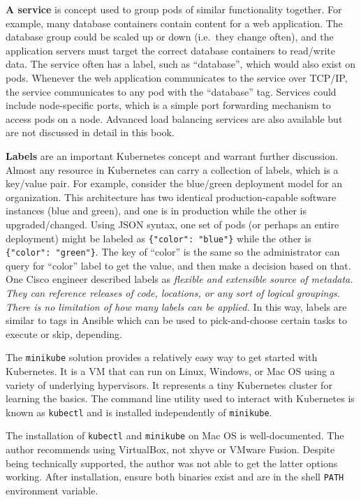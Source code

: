 \textbf{A service} is concept used to group pods of similar functionality
together. For example, many database containers contain content for a web
application. The database group could be scaled up or down (i.e.\ they change
often), and the application servers must target the correct database
containers to read/write data. The service often has a label, such as
``database'', which would also exist on pods. Whenever the web application
communicates to the service over TCP/IP, the service communicates to any pod
with the ``database'' tag. Services could include node-specific ports, which is
a simple port forwarding mechanism to access pods on a node. Advanced load
balancing services are also available but are not discussed in detail in this
book.

\textbf{Labels} are an important Kubernetes concept and warrant further
discussion. Almost any resource in Kubernetes can carry a collection of
labels, which is a key/value pair. For example, consider the blue/green
deployment model for an organization. This architecture has two identical
production-capable software instances (blue and green), and one is in
production while the other is upgraded/changed. Using JSON syntax, one set of
pods (or perhaps an entire deployment) might be labeled as \verb|{"color": "blue"}|
while the other is \verb|{"color": "green"}|. The key of ``color'' is the same so
the administrator can query for ``color'' label to get the value, and then make
a decision based on that. One Cisco engineer described labels as \textit{flexible and
extensible source of metadata. They can reference releases of code, locations,
or any sort of logical groupings. There is no limitation of how many labels
can be applied.} In this way, labels are similar to tags in Ansible which can
be used to pick-and-choose certain tasks to execute or skip, depending.

The \verb|minikube| solution provides a relatively easy way to get started
with Kubernetes. It is a VM that can run on Linux, Windows, or Mac OS using a
variety of underlying hypervisors. It represents a tiny Kubernetes cluster for
learning the basics. The command line utility used to interact with Kubernetes
is known as \verb|kubectl| and is installed independently of \verb|minikube|.

The installation of \verb|kubectl| and \verb|minikube| on Mac OS is
well-documented. The author recommends using VirtualBox, not xhyve or VMware
Fusion. Despite being technically supported, the author was not able to get
the latter options working. After installation, ensure both binaries exist and
are in the shell \verb|PATH| environment variable.

